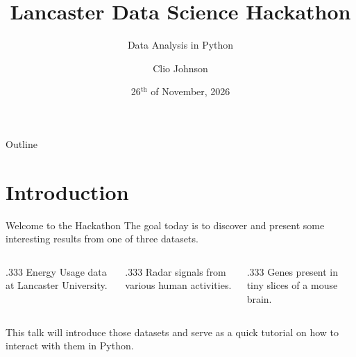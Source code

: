 \title{Lancaster Data Science Hackathon}
\subtitle{Data Analysis in Python}
\author{Clio Johnson}
\date{26${}^\text{th}$ of November, 2026}



\maketitle

\begin{frame}{Outline}
  \tableofcontents
\end{frame}

\section{Introduction}

\begin{frame}{Welcome to the Hackathon}
  The goal today is to discover and present some interesting results from one of three datasets.
  \vspace{12pt}
  \begin{columns}[t]
    \begin{column}{.333\textwidth}
      Energy Usage data at Lancaster University.
    \end{column}
    \begin{column}{.333\textwidth}
      Radar signals from various human activities.
    \end{column}
    \begin{column}{.333\textwidth}
      Genes present in tiny slices of a mouse brain.
    \end{column}
  \end{columns}
  \vspace{12pt}
  This talk will introduce those datasets and serve as a quick tutorial on how to interact with them in Python.
\end{frame}

